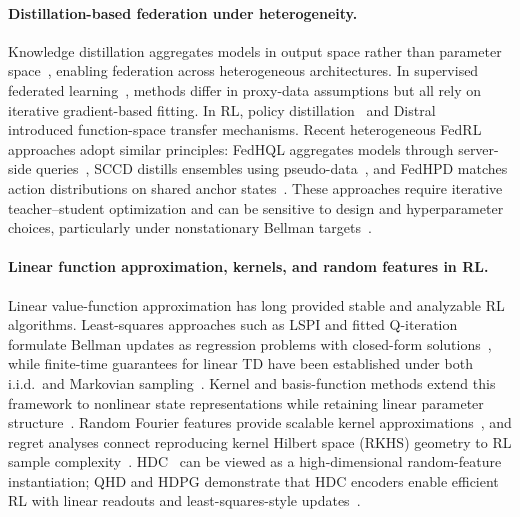 \documentclass[sigconf,anonymous]{aamas}
\theoremstyle{plain}
\theoremstyle{definition}
\theoremstyle{remark}
\begin{document}
\paragraph{Distillation-based federation under heterogeneity.}
Knowledge distillation aggregates models in output space rather than parameter space~\citep{hinton2015distilling}, enabling federation across heterogeneous architectures. In supervised federated learning~\citep{li2019fedmd,lin2021ensembledistillation,zhu2021data,chen2020fedbe}, methods differ in proxy-data assumptions but all rely on iterative gradient-based fitting. In RL, policy distillation~\citep{rusu2016policydistillation} and Distral~\citep{teh2017distral} introduced function-space transfer mechanisms. Recent heterogeneous FedRL approaches adopt similar principles: FedHQL aggregates models through server-side queries~\citep{fan2023fedhql}, SCCD distills ensembles using pseudo-data~\citep{mai2023server}, and FedHPD matches action distributions on shared anchor states~\citep{jiang2025fedhpd}. These approaches require iterative teacher--student optimization and can be sensitive to design and hyperparameter choices, particularly under nonstationary Bellman targets~\citep{czarnecki2019distilling}.



\paragraph{Linear function approximation, kernels, and random features in RL.}
Linear value-function approximation has long provided stable and analyzable RL algorithms. Least-squares approaches such as LSPI and fitted Q-iteration formulate Bellman updates as regression problems with closed-form solutions~\citep{lagoudakis2003least,ernst2005tree}, while finite-time guarantees for linear TD have been established under both i.i.d.\ and Markovian sampling~\citep{bhandari2018finite}. Kernel and basis-function methods extend this framework to nonlinear state representations while retaining linear parameter structure~\citep{ormoneit2002kernel,konidaris2011value}. Random Fourier features provide scalable kernel approximations~\citep{rahimi2007random}, and regret analyses connect reproducing kernel Hilbert space (RKHS) geometry to RL sample complexity~\citep{jin2020provably}. HDC~\citep{kanerva2009hyperdimensional} can be viewed as a high-dimensional random-feature instantiation; QHD and HDPG demonstrate that HDC encoders enable efficient RL with linear readouts and least-squares-style updates~\citep{ni2022qhd,ni2022hdpg}.
\end{document}
